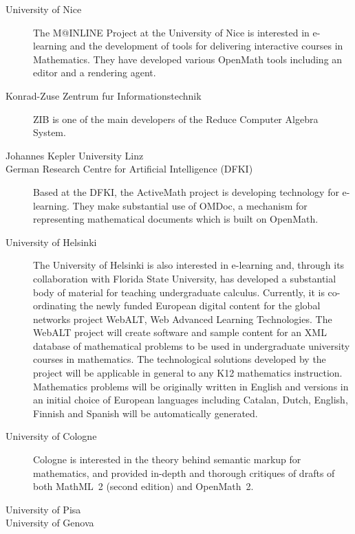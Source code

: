 \documentclass{euproposal}
\begin{document}
\begin{description}
\item[University of Nice] The M@INLINE Project at the University of Nice is interested in
  e-learning and the development of tools for delivering interactive courses in
  Mathematics.  They have developed various OpenMath tools including an editor and a
  rendering agent.
  
\item[Konrad-Zuse Zentrum fur Informationstechnik] ZIB is one of the main developers of
  the Reduce Computer Algebra System.

\item[Johannes Kepler University Linz] 
  
\item[German Research Centre for Artificial Intelligence (DFKI)] Based at the
  DFKI, the ActiveMath project is developing technology for
  e-learning.  They make substantial use of OMDoc, a mechanism for
  representing mathematical documents which is built on OpenMath.
  
\item[University of Helsinki] The University of Helsinki is also
  interested in e-learning and, through its collaboration with Florida
  State University, has developed a substantial body of material for
  teaching undergraduate calculus. Currently, it is co-ordinating the
  newly funded European digital content for the global networks
  project WebALT, Web Advanced Learning Technologies.  The WebALT
  project will create software and sample content for an XML database
  of mathematical problems to be used in undergraduate university
  courses in mathematics.  The technological solutions developed by
  the project will be applicable in general to any K12 mathematics
  instruction.  Mathematics problems will be originally written in
  English and versions in an initial choice of European languages
  including Catalan, Dutch, English, Finnish and Spanish will be
  automatically generated.
  
\item[University of Cologne] Cologne is interested in the theory
  behind semantic markup for mathematics, and provided in-depth and
  thorough critiques of drafts of both MathML~2 (second edition) and
  OpenMath~2.

\item[University of Pisa]
 
\item[University of Genova] 


  
\end{description}
\end{document}
